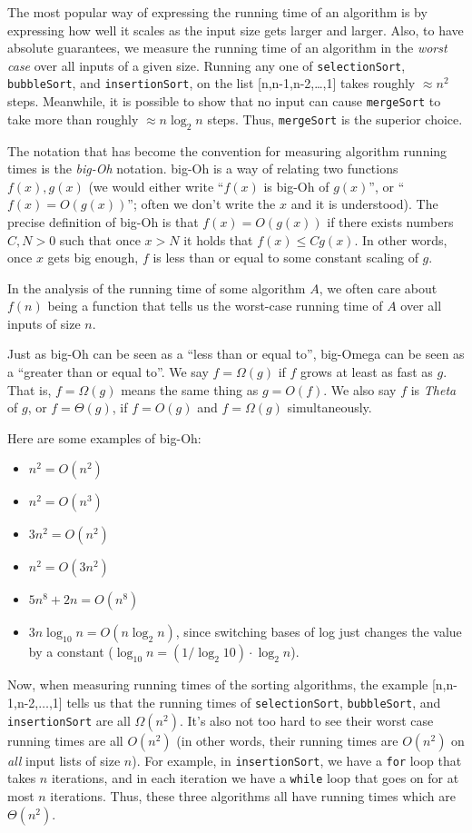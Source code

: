 \documentclass[11pt]{article}
\begin{document}
The most popular way of expressing the running time of an algorithm is
by expressing how well it scales as the input size gets larger and
larger.  Also, to have absolute guarantees, we measure the running
time of an algorithm in the {\em worst case} over all inputs of a
given size.  Running any one of \texttt{selectionSort},
\texttt{bubbleSort}, and \texttt{insertionSort}, on the list
[n,n-1,n-2,\ldots,1] takes roughly $\approx n^2$ steps.  Meanwhile, it is possible
to show that no input can cause \texttt{mergeSort} to take more than
roughly $\approx n\log_2 n$ steps.  Thus, \texttt{mergeSort}
is the superior choice.

The notation that has become the convention for measuring algorithm
running times is the {\em big-Oh} notation.  big-Oh is a way of
relating two functions $f(x),g(x)$ (we would either write ``$f(x)$ is
big-Oh of
$g(x)$'', or ``$f(x) = O(g(x))$''; often we don't write the $x$ and it is
understood).  The precise definition of big-Oh is that $f(x) = O(g(x))$ if there exists numbers $C, N >0$ such that once $x > N$ it holds that $f(x) \le C g(x)$. In other words, once $x$ gets big enough, $f$ is less than or equal to some constant scaling of $g$.

In the analysis of the running time of some algorithm $A$, we often
care about $f(n)$ being a function that tells us the worst-case
running time of $A$ over all inputs of size $n$.

Just as big-Oh can be seen as a ``less than or equal to'', big-Omega
can be seen as a ``greater than or equal to''.  We say $f = \Omega(g)$
if $f$ grows at least as fast as $g$. That is, $f = \Omega(g)$ means the same thing as $g = O(f)$. We also say $f$ is {\em
  Theta} of $g$, or $f = \Theta(g)$, if $f = O(g)$ and $f = \Omega(g)$ simultaneously. 

Here are some examples of big-Oh:
\begin{itemize}
\item $n^2 = O(n^2)$
\item $n^2 = O(n^3)$
\item $3n^2 = O(n^2)$
\item $n^2 = O(3n^2)$
\item $5n^8 + 2n = O(n^8)$
\item $3n\log_{10} n = O(n\log_2 n)$, since switching bases of log
  just changes the value by a constant ($\log_{10} n =
  (1/\log_2{10})\cdot \log_2 n$).
\end{itemize}

Now, when measuring running times of the sorting algorithms, the
example [n,n-1,n-2,$\ldots$,1] tells us that the running times of
\texttt{selectionSort},
\texttt{bubbleSort}, and \texttt{insertionSort} are all
$\Omega(n^2)$.  It's also not too hard to see their worst case running
times are all $O(n^2)$
(in other words, their running times are $O(n^2)$ on {\em all} input
lists of size $n$).
For example, in \texttt{insertionSort}, we have a \texttt{for} loop
that takes $n$ iterations, and in each iteration we have a
\texttt{while} loop that goes on for at most $n$ iterations.  Thus,
these three algorithms all have running times which are $\Theta(n^2)$.
\end{document}
